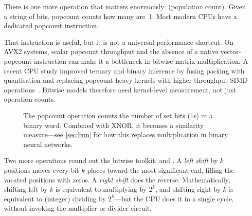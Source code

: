 There is one more operation that matters enormously: 
(population count). Given a string of bits, popcount counts how many
are~1. Most modern CPUs have a dedicated popcount instruction.

That instruction is useful, but it is not a universal performance shortcut.
On AVX2 systems, scalar popcount throughput and the absence of a native
vector-popcount instruction can make it a bottleneck in bitwise matrix
multiplication. A recent CPU study improved ternary and binary inference
by fusing packing with quantisation and replacing popcount-heavy kernels
with higher-throughput SIMD operations~\cite{fischer2025popcount}. Bitwise
models therefore need kernel-level measurement, not just operation counts.

\begin{figure}[htbp]
\centering
{}
\caption{The popcount operation counts the number of set bits (1s) in
  a binary word. Combined with XNOR, it becomes a similarity
  measure---see \cref{sec:bnn} for how this replaces multiplication
  in binary neural networks.}
\label{fig:popcount}
\end{figure}

Two more operations round out the bitwise toolkit:
 and . A \emph{left shift}
by $k$ positions moves every bit $k$ places toward the most
significant end, filling the vacated positions with zeros. A
\emph{right shift} does the reverse. Mathematically, shifting left by
$k$ is equivalent to multiplying by $2^k$, and shifting right by $k$
is equivalent to (integer) dividing by $2^k$---but the CPU does it in
a single cycle, without invoking the multiplier or divider circuit.

